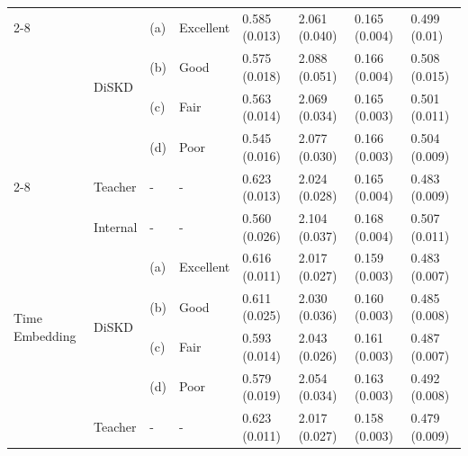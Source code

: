 \documentclass{article}
\theoremstyle{plain}
\theoremstyle{definition}
\theoremstyle{remark}
\begin{document}
\begin{table}[htbp]
\begin{small}
\begin{tabular}{llllllll}
\cmidrule{2-8} & \multirow{4}{*}{DiSKD} & (a) & Excellent & \cellcolor{blkC!36}0.585 (0.013) & \cellcolor{blkC!36}2.061 (0.040) & \cellcolor{blkC!44}0.165 (0.004) & \cellcolor{blkC!36}0.499 (0.01) \\
                                 & & (b) & Good & \cellcolor{blkC!28}0.575 (0.018) & \cellcolor{blkC!20}2.088 (0.051) & \cellcolor{blkC!28}0.166 (0.004) & \cellcolor{blkC!20}0.508 (0.015) \\
                                 & & (c) & Fair & \cellcolor{blkC!28}0.563 (0.014) & \cellcolor{blkC!28}2.069 (0.034) & \cellcolor{blkC!44}0.165 (0.003) & \cellcolor{blkC!28}0.501 (0.011) \\
                                 & & (d) & Poor & \cellcolor{blkC!12}0.545 (0.016) & \cellcolor{blkC!28}2.077 (0.030) & \cellcolor{blkC!28}0.166 (0.003) & \cellcolor{blkC!28}0.504 (0.009) \\ 
\cmidrule{2-8} 
& Teacher & - & - & \cellcolor{blkC!44}0.623 (0.013) & \cellcolor{blkC!44}2.024 (0.028) & \cellcolor{blkC!44}0.165 (0.004) & \cellcolor{blkC!44}0.483 (0.009) \\ 
\hline\hline
\multirow{6}{*}{Time Embedding} & Internal & - & - & \cellcolor{blkD!12}0.560 (0.026) & \cellcolor{blkD!12}2.104 (0.037) & \cellcolor{blkD!12}0.168 (0.004) & \cellcolor{blkD!12}0.507 (0.011) \\ 
\cmidrule{2-8} & \multirow{4}{*}{DiSKD} & (a) & Excellent & \cellcolor{blkD!36}0.616 (0.011) & \cellcolor{blkD!44}2.017 (0.027) & \cellcolor{blkD!36}0.159 (0.003) & \cellcolor{blkD!36}0.483 (0.007) \\
                                     & & (b) & Good & \cellcolor{blkD!28}0.611 (0.025) & \cellcolor{blkD!28}2.030 (0.036) & \cellcolor{blkD!28}0.160 (0.003) & \cellcolor{blkD!28}0.485 (0.008) \\
                                     & & (c) & Fair & \cellcolor{blkD!28}0.593 (0.014) & \cellcolor{blkD!28}2.043 (0.026) & \cellcolor{blkD!28}0.161 (0.003) & \cellcolor{blkD!28}0.487 (0.007) \\
                                     & & (d) & Poor & \cellcolor{blkD!20}0.579 (0.019) & \cellcolor{blkD!20}2.054 (0.034) & \cellcolor{blkD!20}0.163 (0.003) & \cellcolor{blkD!20}0.492 (0.008) \\ 
\cmidrule{2-8} 
& Teacher & - & - & \cellcolor{blkD!44}0.623 (0.011) & \cellcolor{blkD!44}2.017 (0.027) & \cellcolor{blkD!44}0.158 (0.003) & \cellcolor{blkD!44}0.479 (0.009) \\ 

\end{tabular}
\end{small}
\end{table}
\end{document}
